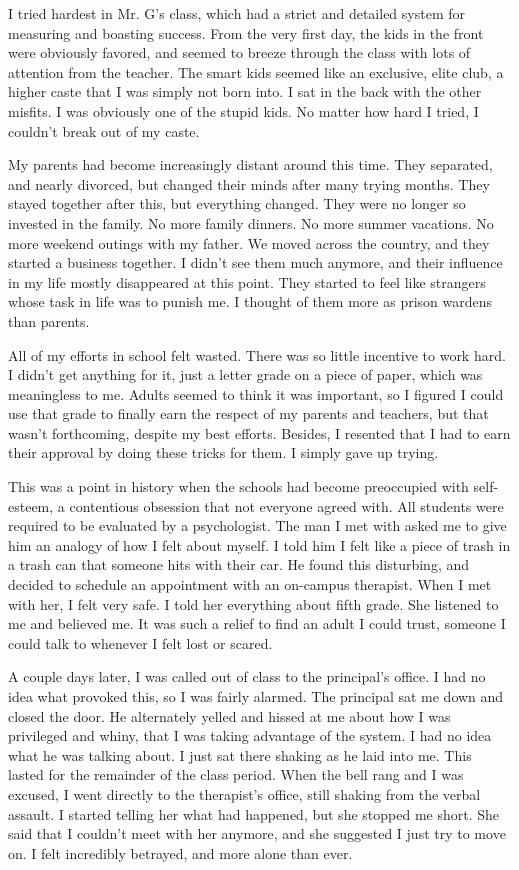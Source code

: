 I tried hardest in Mr. G's class, which had a strict and detailed system for measuring and boasting success. From the very first day, the kids in the front were obviously favored, and seemed to breeze through the class with lots of attention from the teacher. The smart kids seemed like an exclusive, elite club, a higher caste that I was simply not born into. I sat in the back with the other misfits. I was obviously one of the stupid kids. No matter how hard I tried, I couldn't break out of my caste.

My parents had become increasingly distant around this time. They separated, and nearly divorced, but changed their minds after many trying months. They stayed together after this, but everything changed. They were no longer so invested in the family. No more family dinners. No more summer vacations. No more weekend outings with my father. We moved across the country, and they started a business together. I didn't see them much anymore, and their influence in my life mostly disappeared at this point. They started to feel like strangers whose task in life was to punish me. I thought of them more as prison wardens than parents.

All of my efforts in school felt wasted. There was so little incentive to work hard. I didn't get anything for it, just a letter grade on a piece of paper, which was meaningless to me. Adults seemed to think it was important, so I figured I could use that grade to finally earn the respect of my parents and teachers, but that wasn't forthcoming, despite my best efforts. Besides, I resented that I had to earn their approval by doing these tricks for them. I simply gave up trying.

This was a point in history when the schools had become preoccupied with self-esteem, a contentious obsession that not everyone agreed with. All students were required to be evaluated by a psychologist. The man I met with asked me to give him an analogy of how I felt about myself. I told him I felt like a piece of trash in a trash can that someone hits with their car. He found this disturbing, and decided to schedule an appointment with an on-campus therapist. When I met with her, I felt very safe. I told her everything about fifth grade. She listened to me and believed me. It was such a relief to find an adult I could trust, someone I could talk to whenever I felt lost or scared.

A couple days later, I was called out of class to the principal's office. I had no idea what provoked this, so I was fairly alarmed. The principal sat me down and closed the door. He alternately yelled and hissed at me about how I was privileged and whiny, that I was taking advantage of the system. I had no idea what he was talking about. I just sat there shaking as he laid into me. This lasted for the remainder of the class period. When the bell rang and I was excused, I went directly to the therapist's office, still shaking from the verbal assault. I started telling her what had happened, but she stopped me short. She said that I couldn't meet with her anymore, and she suggested I just try to move on. I felt incredibly betrayed, and more alone than ever.

